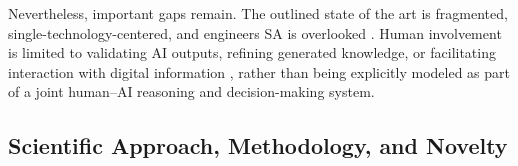 \documentclass[12pt,a4paper]{article}
\newif\iftemplatenotes
\newcommand{\lengthnote}[1]{%
  \iftemplatenotes
    {\small\itshape\color{gray!70!black} [Target length: #1]}\par\vspace{4pt}
  \fi
}
\begin{document}
Nevertheless, important gaps remain. The outlined state of the art is fragmented, single-technology-centered, and engineers SA is overlooked \cite{celik_vision_2026}. Human involvement is limited to validating AI outputs, refining generated knowledge, or facilitating interaction with digital information \cite{li_human---loop_2026,luo_chattwin_2026}, rather than being explicitly modeled as part of a joint human–AI reasoning and decision-making system.
%
\subsection{Scientific Approach, Methodology, and Novelty}
\justifying
\setlength{\parindent}{0pt}
\setlength{\parskip}{0.8em}
\end{document}
